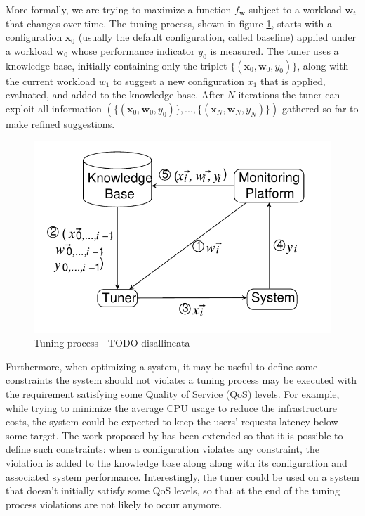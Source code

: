 \documentclass[a4paper]{article} %
\begin{document}
	More formally, we are trying to maximize a function $f_{\pmb{w}}$ subject to a workload $\pmb{w}_t$ that changes over time. The tuning process, shown in figure \ref{fig:cgp_it_sys}, starts with a configuration $\pmb{x}_0$ (usually the default configuration, called baseline) applied under a workload $\pmb{w}_0$ whose performance indicator $y_0$ is measured. The tuner uses a knowledge base, initially containing only the triplet $\{(\pmb{x}_0, \pmb{w}_0, y_0)\}$, along with the current workload $w_1$ to suggest a new configuration $x_1$ that is applied, evaluated, and added to the knowledge base. After $N$ iterations the tuner can exploit all information $(\{(\pmb{x}_0, \pmb{w}_0, y_0)\}, ..., \{(\pmb{x}_N, \pmb{w}_N, y_N)\})$ gathered so far to make refined suggestions.
	\begin{figure} \label{fig:cgp_it_sys}
		\includegraphics[width=\linewidth]{img/cgp_it_sys.png}
		\caption{Tuning process - TODO disallineata}
	\end{figure}
	Furthermore, when optimizing a system, it may be useful to define some constraints the system should not violate: a tuning process may be executed with the requirement satisfying some Quality of Service (QoS) levels. For example, while trying to minimize the average CPU usage to reduce the infrastructure costs, the system could be expected to keep the users' requests latency below some target.  The work proposed by \cite{AkamasCGP} has been extended so that it is possible to define such constraints: when a configuration violates any constraint, the violation is added to the knowledge base along along with its configuration and associated system performance. Interestingly, the tuner could be used on a system that doesn't initially satisfy some QoS levels, so that at the end of the tuning process violations are not likely to occur anymore.
	
\end{document}
